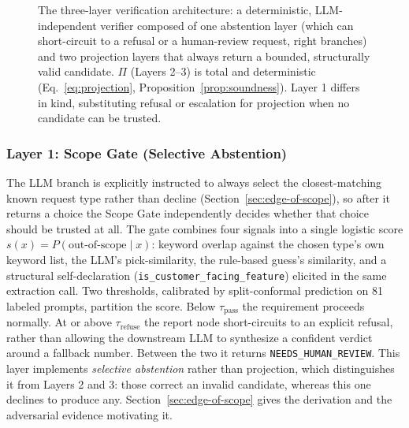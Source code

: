 \documentclass[journal, 10pt]{IEEEtran}
\begin{document}
\begin{figure}[t]
{%
}
\caption{The three-layer verification architecture: a deterministic, LLM-independent verifier composed of one abstention layer (which can short-circuit to a refusal or a human-review request, right branches) and two projection layers that always return a bounded, structurally valid candidate. $\Pi$ (Layers 2--3) is total and deterministic (Eq.~\ref{eq:projection}, Proposition~\ref{prop:soundness}). Layer 1 differs in kind, substituting refusal or escalation for projection when no candidate can be trusted.}
\label{fig:verification}
\end{figure}

\subsubsection{Layer 1: Scope Gate (Selective Abstention)}
\label{sec:scope-gate}
The LLM branch is explicitly instructed to always select the closest-matching known request type rather than decline (Section~\ref{sec:edge-of-scope}), so after it returns a choice the Scope Gate independently decides whether that choice should be trusted at all. The gate combines four signals into a single logistic score $s(x) = P(\text{out-of-scope}\mid x)$: keyword overlap against the chosen type's own keyword list, the LLM's pick-similarity, the rule-based guess's similarity, and a structural self-declaration (\texttt{is\_customer\_facing\_feature}) elicited in the same extraction call. Two thresholds, calibrated by split-conformal prediction \cite{angelopoulos2023conformal} on 81 labeled prompts, partition the score. Below $\tau_{\text{pass}}$ the requirement proceeds normally. At or above $\tau_{\text{refuse}}$ the report node short-circuits to an explicit refusal, rather than allowing the downstream LLM to synthesize a confident verdict around a fallback number. Between the two it returns \texttt{NEEDS\_HUMAN\_REVIEW}. This layer implements \emph{selective abstention} rather than projection, which distinguishes it from Layers 2 and 3: those correct an invalid candidate, whereas this one declines to produce any. Section~\ref{sec:edge-of-scope} gives the derivation and the adversarial evidence motivating it.
\end{document}

